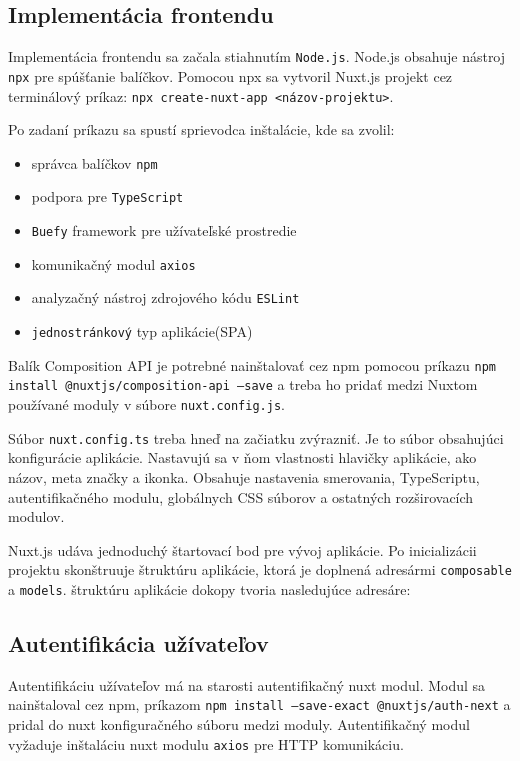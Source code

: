 \subsection{Implementácia frontendu}
Implementácia frontendu sa začala stiahnutím \texttt{Node.js}. Node.js obsahuje nástroj \texttt{npx} pre spúšťanie balíčkov. Pomocou npx sa vytvoril Nuxt.js projekt cez terminálový príkaz: \texttt{npx create-nuxt-app <názov-projektu>}. 

\vspace{5mm}
Po zadaní príkazu sa spustí sprievodca inštalácie, kde sa zvolil:
    \begin{itemize}
        \item správca balíčkov \texttt{npm}
        \item podpora pre \texttt{TypeScript}
        \item \texttt{Buefy} framework pre užívateľské prostredie
        \item komunikačný modul \texttt{axios}
        \item analyzačný nástroj zdrojového kódu \texttt{ESLint} 
        \item \texttt{jednostránkový} typ aplikácie(SPA)
    \end{itemize}
    
\vspace{5mm}
Balík Composition API je potrebné nainštalovať cez npm pomocou príkazu \texttt{npm install @nuxtjs/composition-api --save} a treba ho pridať medzi Nuxtom používané moduly v súbore \texttt{nuxt.config.js}.

Súbor \texttt{nuxt.config.ts} treba hneď na začiatku zvýrazniť. Je to súbor obsahujúci konfigurácie aplikácie. Nastavujú sa v ňom vlastnosti hlavičky aplikácie, ako názov, meta značky a ikonka. Obsahuje nastavenia smerovania, TypeScriptu, autentifikačného modulu, globálnych CSS súborov a ostatných rozširovacích modulov.

Nuxt.js udáva jednoduchý štartovací bod pre vývoj aplikácie. Po inicializácii projektu skonštruuje štruktúru aplikácie, ktorá je doplnená adresármi \texttt{composable} a \texttt{models}. štruktúru aplikácie dokopy tvoria nasledujúce adresáre:

\vspace{5mm}
\vspace{5mm}

\subsection{Autentifikácia užívateľov}
Autentifikáciu užívateľov má na starosti autentifikačný nuxt modul. Modul sa nainštaloval cez npm, príkazom \texttt{npm install --save-exact @nuxtjs/auth-next} a pridal do nuxt konfiguračného súboru medzi moduly. Autentifikačný modul vyžaduje inštaláciu nuxt modulu \texttt{axios} pre HTTP komunikáciu. 


